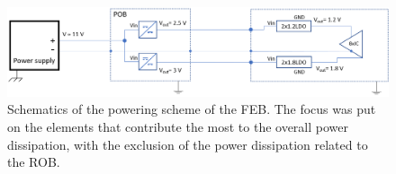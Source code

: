  \begin{figure}[h!]
\centering
\includegraphics[width=1\columnwidth]{Chapter6/DCS/images/powering_diss_feb.png}
\caption{Schematics of the powering scheme of the \gls{FEB}. The focus was put on the elements that contribute the most to the overall power dissipation, with the exclusion of the power dissipation related to the \gls{ROB}.}
\label{fig_power_scheme}
\end{figure}
\begin{table}[!h]
\centering
\caption{Power dissipation of the powering system in the function of the CSA registers values. Once the ASICs are configured, the digital line current remains constant. }
\label{tab:distribution}
\end{table}

